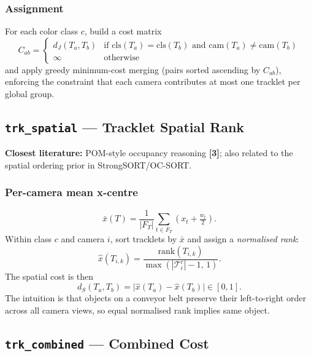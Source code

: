 \documentclass[11pt,a4paper]{article}
\newcommand{\lit}[1]{\textbf{\small[#1]}}
\begin{document}
\subsubsection*{Assignment}
For each color class $c$, build a cost matrix
\begin{equation}
  C_{ab} =
  \begin{cases}
    d_J(T_a, T_b) & \text{if } \text{cls}(T_a) = \text{cls}(T_b)
                    \text{ and } \text{cam}(T_a) \ne \text{cam}(T_b)\\
    \infty & \text{otherwise}
  \end{cases}
\end{equation}
and apply greedy minimum-cost merging (pairs sorted ascending by $C_{ab}$),
enforcing the constraint that each camera contributes at most one tracklet
per global group.

\subsection{\texttt{trk\_spatial} — Tracklet Spatial Rank}

\textbf{Closest literature:} POM-style occupancy reasoning \lit{3}; also
related to the spatial ordering prior in StrongSORT/OC-SORT.

\subsubsection*{Per-camera mean x-centre}
\begin{equation}
  \bar{x}(T) = \frac{1}{|F_T|}
  \sum_{t \in F_T} \!\left(x_t + \tfrac{w_t}{2}\right).
\end{equation}
Within class $c$ and camera $i$, sort tracklets by $\bar{x}$ and assign a
\textit{normalised rank}:
\begin{equation}
  \hat{x}(T_{i,k}) = \frac{\text{rank}(T_{i,k})}{\max(|\mathcal{T}^c_i|-1,\,1)}.
\end{equation}
The spatial cost is then
\begin{equation}
  d_S(T_a, T_b) = \bigl|\hat{x}(T_a) - \hat{x}(T_b)\bigr| \in [0,1].
\end{equation}
The intuition is that objects on a conveyor belt preserve their left-to-right
order across all camera views, so equal normalised rank implies same object.

\subsection{\texttt{trk\_combined} — Combined Cost}
\end{document}
